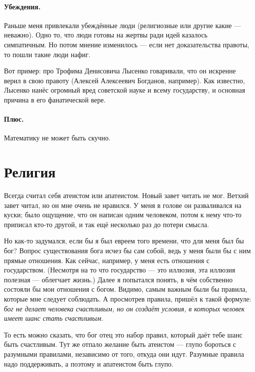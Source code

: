 \documentclass{book}
\begin{document}
\paragraph{Убеждения.}
Раньше меня привлекали убеждённые люди (религиозные или другие какие --- неважно).
Одно то, что люди готовы на жертвы ради идей казалось симпатичным.
Но потом мнение изменилось --- если нет доказательства правоты, то пошли такие люди нафиг.

Вот пример: про Трофима Денисовича Лысенко говаривали, что он искренне верил в свою правоту (Алексей Алексеевич Богданов, например).
Как известно, Лысенко нанёс огромный вред советской науке и всему государству, и основная причина в его фанатической вере.

\paragraph{Плюс.}
Математику не может быть скучно.

\section*{Религия}

Всегда считал себя атеистом или апатеистом.
Новый завет читать не мог.
Ветхий завет читал, но он мне очень не нравился.
У меня в голове он разваливался на куски; было ощущение, что он написан одним человеком, потом к нему что-то приписал кто-то другой, и так ещё несколько раз до потери смысла.

Но как-то задумался, если бы я был евреем того времени, что для меня был бы бог?
Вопрос существования бога исчез бы сам собой, ведь у меня были бы с ним прямые отношения.
Как сейчас, например, у меня есть отношения с государством. 
(Несмотря на то что государство --- это иллюзия, эта иллюзия полезная --- облегчает жизнь.)
Далее я попытался понять, в чём собственно состояли бы мои отношения с богом.
Видимо, самым важным были бы правила, которые мне следует соблюдать.
А просмотрев правила, пришёл к такой формуле: \emph{бог не делает человека счастливым, но он создаёт условия, в которых человек имеет шанс стать счастливым}.

То есть можно сказать, что бог отец это набор правил, который даёт тебе шанс быть счастливым.
Тут же отпало желание быть атеистом --- глупо бороться с разумными правилами, независимо от того, откуда они идут.
Разумные правила надо поддерживать, а поэтому и апатеистом быть глупо.
\end{document}

